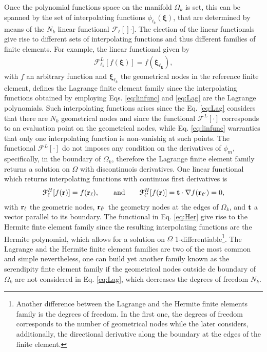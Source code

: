      Once the polynomial functions space on the manifold $\Omega_k$ is set, this can be spanned by the set of interpolating functions $\phi_{i_k}(\boldsymbol{\xi})$, that are determined by means of the $N_k$ linear functional  $\mathcal{F}_\ell[]\cdot]$.   The election of the  linear functionals give rise to different sets of interpolating functions and thus different families of finite elements. For example, the linear functional given by
     \begin{align}
    \mathcal{F}^{L}_{\ell_k}[f(\boldsymbol{\xi})] = f(\boldsymbol{\xi_{\ell_k}}) ,
    \label{eq:Lag}
     \end{align}
     with $f$ an arbitrary function and $\boldsymbol{\xi}_{\ell_k}$ the geometrical nodes in the reference finite element, defines the Lagrange finite element family since the  interpolating functions obtained by employing Eqs. \eqref{eq:linfunc} and \eqref{eq:Lag} are the Lagrange polynomials. Such interpolating functions arises since the Eq.  \eqref{eq:Lag} considers that there are $N_k$ geometrical nodes and since the functional $\mathcal{F}^{L}[\cdot]$ corresponds to an evaluation point on the geometrical nodes, while Eq. \eqref{eq:linfunc} warranties that only one interpolating function is non-vanishig at such points. The functional $\mathcal{F}^{L}[\cdot]$ do not imposes any condition on the derivatives of $\phi_m$, specifically, in the boundary of $\Omega_k$, therefore the Lagrange finite element family returns a solution on $\Omega$ with discontinuois derivatives. One linear functional which returns interpolating functions with continuos first derivatives is
     \begin{align}
         \mathcal{F}^{H}_\ell[f(\vb{r})] = f(\vb{r}_\ell) ,
         \qquad
         \text{and}
         \qquad
         \mathcal{F}^{H}_{\ell'}[f(\vb{r})] = \vb{t}\cdot\nabla f(\vb{r}_{\ell'}) = 0 ,
     \label{eq:Her}
    \end{align}
     with $\vb{r}_\ell$ the geometric nodes, $\vb{r}_{\ell'}$ the geometry nodes at the edges of $\Omega_k$, and $\vb{t}$ a vector parallel to its boundary. The functional in Eq. \eqref{eq:Her} give rise to the Hermite finte element family since the resulting interpolating functions are the Hermite polynomial, which allows for a solution on $\Omega$ 1-differentiable\footnote{Another difference between the Lagrange and the Hermite finite elements family is the degrees of freedom. In the first one, the degrees of freedom corresponds to the number of geometrical nodes while the later considers, additionally, the directional derivative along the boundary at the edges of the finite element. }.  The Lagrange and the Hermite finite element families are two of the most common and simple nevertheless, one can build yet another family known as the serendipity finte element family  if the geometrical nodes outside de boundary of $\Omega_k$ are not considered in Eq. \eqref{eq:Lag}, which decreases the degrees of freedom $N_k$.

